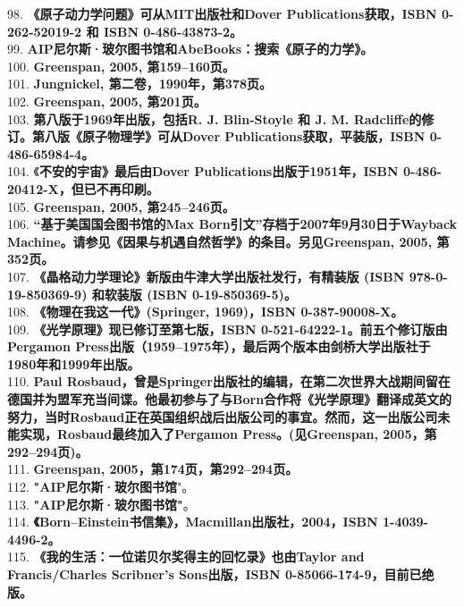 98. \textbf{《原子动力学问题》可从MIT出版社和Dover Publications获取，ISBN 0-262-52019-2 和 ISBN 0-486-43873-2。}\\
99.  \textbf{AIP尼尔斯·玻尔图书馆和AbeBooks：搜索《原子的力学》。}\\ 
100. \textbf{Greenspan, 2005, 第159–160页。}\\
101. \textbf{Jungnickel, 第二卷，1990年，第378页。}\\ 
102. \textbf{Greenspan, 2005, 第201页。}\\
103. \textbf{第八版于1969年出版，包括R. J. Blin-Stoyle 和 J. M. Radcliffe的修订。第八版《原子物理学》可从Dover Publications获取，平装版，ISBN 0-486-65984-4。}\\
104. 《\textbf{不安的宇宙》最后由Dover Publications出版于1951年，ISBN 0-486-20412-X，但已不再印刷。}\\
105. \textbf{Greenspan, 2005, 第245–246页。}\\
106. \textbf{“基于美国国会图书馆的Max Born引文”存档于2007年9月30日于Wayback Machine。请参见《因果与机遇自然哲学》的条目。另见Greenspan, 2005, 第352页。}\\
107. \textbf{《晶格动力学理论》新版由牛津大学出版社发行，有精装版 (ISBN 978-0-19-850369-9) 和软装版 (ISBN 0-19-850369-5)。}\\ 
108. \textbf{《物理在我这一代》(Springer, 1969)，ISBN 0-387-90008-X。}\\ 
109. \textbf{《光学原理》现已修订至第七版，ISBN 0-521-64222-1。前五个修订版由Pergamon Press出版（1959–1975年），最后两个版本由剑桥大学出版社于1980年和1999年出版。}\\ 
110. \textbf{Paul Rosbaud，曾是Springer出版社的编辑，在第二次世界大战期间留在德国并为盟军充当间谍。他最初参与了与Born合作将《光学原理》翻译成英文的努力，当时Rosbaud正在英国组织战后出版公司的事宜。然而，这一出版公司未能实现，Rosbaud最终加入了Pergamon Press。(见Greenspan, 2005，第292–294页)。} \\
111. \textbf{Greenspan, 2005，第174页，第292–294页。}\\
112. \textbf{"AIP尼尔斯·玻尔图书馆}"。\\
113. \textbf{"AIP尼尔斯·玻尔图书馆"}。\\
114. \textbf{《Born–Einstein书信集》，Macmillan出版社，2004，ISBN 1-4039-4496-2。}\\ 
115. \textbf{《我的生活：一位诺贝尔奖得主的回忆录》也由Taylor and Francis/Charles Scribner's Sons出版，ISBN 0-85066-174-9，目前已绝版。}\\